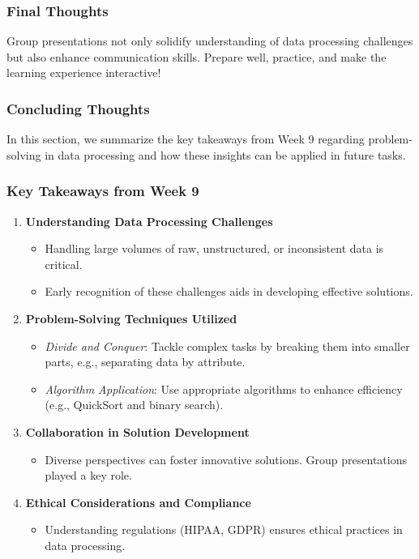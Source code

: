 \documentclass[aspectratio=169]{beamer}
\begin{document}
\begin{frame}[fragile]
    \frametitle{Final Thoughts}
    Group presentations not only solidify understanding of data processing challenges but also enhance communication skills. Prepare well, practice, and make the learning experience interactive!
\end{frame}

\begin{frame}[fragile]
    \frametitle{Concluding Thoughts}
    In this section, we summarize the key takeaways from Week 9 regarding problem-solving in data processing and how these insights can be applied in future tasks.
\end{frame}

\begin{frame}[fragile]
    \frametitle{Key Takeaways from Week 9}
    \begin{enumerate}
        \item \textbf{Understanding Data Processing Challenges}
        \begin{itemize}
            \item Handling large volumes of raw, unstructured, or inconsistent data is critical.
            \item Early recognition of these challenges aids in developing effective solutions.
        \end{itemize}
        
        \item \textbf{Problem-Solving Techniques Utilized}
        \begin{itemize}
            \item \textit{Divide and Conquer}: Tackle complex tasks by breaking them into smaller parts, e.g., separating data by attribute.
            \item \textit{Algorithm Application}: Use appropriate algorithms to enhance efficiency (e.g., QuickSort and binary search).
        \end{itemize}
        
        \item \textbf{Collaboration in Solution Development}
        \begin{itemize}
            \item Diverse perspectives can foster innovative solutions. Group presentations played a key role.
        \end{itemize}
        
        \item \textbf{Ethical Considerations and Compliance}
        \begin{itemize}
            \item Understanding regulations (HIPAA, GDPR) ensures ethical practices in data processing.
        \end{itemize}
    \end{enumerate}
\end{frame}
\end{document}

